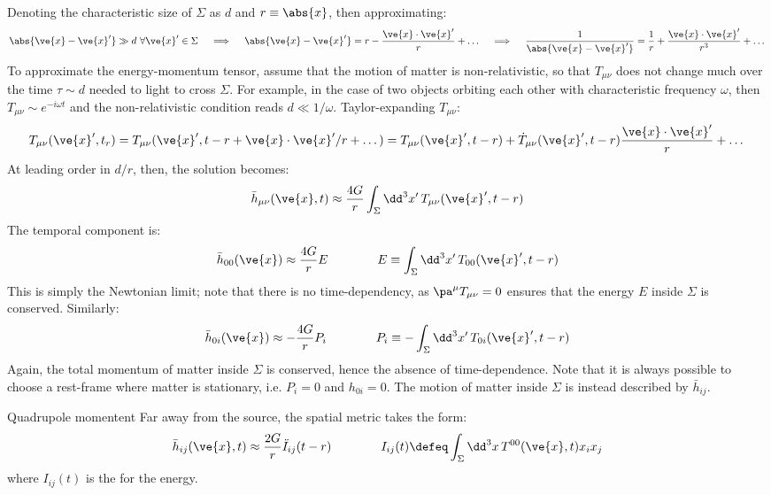 Denoting the characteristic size of $ \Sigma $ as $ d $ and $ r \equiv \abs{x} $, then approximating:
\begin{equation*}
  \abs{\ve{x} - \ve{x}'} \gg d \,\,\forall \ve{x}' \in \Sigma
  \quad \implies \quad
  \abs{\ve{x} - \ve{x}'} = r - \frac{\ve{x} \cdot \ve{x}'}{r} + \dots
  \quad \implies \quad
  \frac{1}{\abs{\ve{x} - \ve{x}'}} = \frac{1}{r} + \frac{\ve{x} \cdot \ve{x}'}{r^3} + \dots
\end{equation*}
To approximate the energy-momentum tensor, assume that the motion of matter is non-relativistic, so that $ T_{\mu \nu} $ does not change much over the time $ \tau \sim d $ needed to light to cross $ \Sigma $. For example, in the case of two objects orbiting each other with characteristic frequency $ \omega $, then $ T_{\mu \nu} \sim e^{-i \omega t} $ and the non-relativistic condition reads $ d \ll 1/\omega $. Taylor-expanding $ T_{\mu \nu} $:
\begin{equation*}
  T_{\mu \nu}(\ve{x}',t_r) = T_{\mu \nu} (\ve{x}', t - r + \ve{x} \cdot \ve{x}' / r + \dots) = T_{\mu \nu}(\ve{x}', t - r) + \dot{T}_{\mu \nu} (\ve{x}', t - r) \frac{\ve{x} \cdot \ve{x}'}{r} + \dots
\end{equation*}
At leading order in $ d/r $, then, the solution becomes:
\begin{equation*}
  \bar{h}_{\mu \nu} (\ve{x},t) \approx \frac{4G}{r} \int_\Sigma \dd^3 x'\, T_{\mu \nu}(\ve{x}', t - r)
\end{equation*}
The temporal component is:
\begin{equation*}
  \bar{h}_{00}(\ve{x}) \approx \frac{4G}{r} E
  \qquad \qquad
  E \equiv \int_\Sigma \dd^3 x'\, T_{00}(\ve{x}', t - r)
\end{equation*}
This is simply the Newtonian limit; note that there is no time-dependency, as $ \pa^\mu T_{\mu \nu} = 0 $ ensures that the energy $ E $ inside $ \Sigma $ is conserved. Similarly:
\begin{equation*}
  \bar{h}_{0 i}(\ve{x}) \approx - \frac{4G}{r} P_i
  \qquad \qquad
  P_i \equiv - \int_\Sigma \dd^3 x'\, T_{0 i}(\ve{x}', t - r)
\end{equation*}
Again, the total momentum of matter inside $ \Sigma $ is conserved, hence the absence of time-dependence. Note that it is always possible to choose a rest-frame where matter is stationary, i.e. $ P_i = 0 $ and $ h_{0 i} = 0 $. The motion of matter inside $ \Sigma $ is instead described by $ \bar{h}_{ij} $.

\begin{proposition}{Quadrupole momentent}{}
  Far away from the source, the spatial metric takes the form:
  \begin{equation}
    \bar{h}_{ij}(\ve{x},t) \approx \frac{2G}{r} \ddot{I}_{ij}(t - r)
    \qquad \qquad
    I_{ij}(t) \defeq \int_\Sigma \dd^3 x\, T^{00}(\ve{x},t) x_i x_j
    \label{eq:quarupole-moment}
  \end{equation}
  where $ I_{ij}(t) $ is the  for the energy.
\end{proposition}


